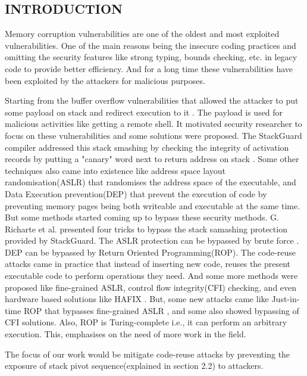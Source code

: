 \documentclass{article}
\begin{document}
	\begin{multicols}{2}
	\section{INTRODUCTION}
	Memory corruption vulnerabilities are one of the oldest and most exploited vulnerabilities. One of the main reasons being the insecure coding practices and omitting the security features like strong typing, bounds checking, etc. in legacy code to provide better efficiency. And for a long time these vulnerabilities have been exploited by the attackers for malicious purposes.

	Starting from the buffer overflow vulnerabilities that allowed the attacker to put some payload on stack and redirect execution to it \cite{aleph}. The payload is used for malicious activities like getting a remote shell. It motivated security researcher to focus on these vulnerabilities and some solutions were proposed. The StackGuard compiler addressed this stack smashing by checking the integrity of activation records by putting a "canary" word next to return address on stack \cite{stackguard}. Some other techniques also came into existence like address space layout randomisation(ASLR) \cite{pax} that randomises the address space of the executable, and Data Execution prevention(DEP) that prevent the execution of code by preventing memory pages being both writeable and executable at the same time. But some methods started coming up to bypass these security methods. G. Richarte et al. \cite{4trick} presented four tricks to bypass the stack samashing protection provided by StackGuard. The ASLR protection can be bypassed by brute force \cite{effaslr}. DEP can be bypassed by Return Oriented Programming(ROP). The code-reuse  attacks came in practice that instead of inserting new code, reuses the present executable code to perform operations they need. And some more methods were proposed like fine-grained ASLR, control flow integrity(CFI) checking, and even hardware based solutions like HAFIX \cite{hafix}. But, some new attacks came like Just-in-time ROP that bypasses fine-grained ASLR \cite{jitrop}, and some also showed bypassing of CFI solutions. Also, ROP is Turing-complete i.e., it can perform an arbitrary execution. This, emphasises on the need of more work in the field.
	
	The focus of our work would be mitigate code-reuse attacks by preventing the exposure of stack pivot sequence(explained in section 2.2) to attackers.
	

\end{multicols}
\end{document}
